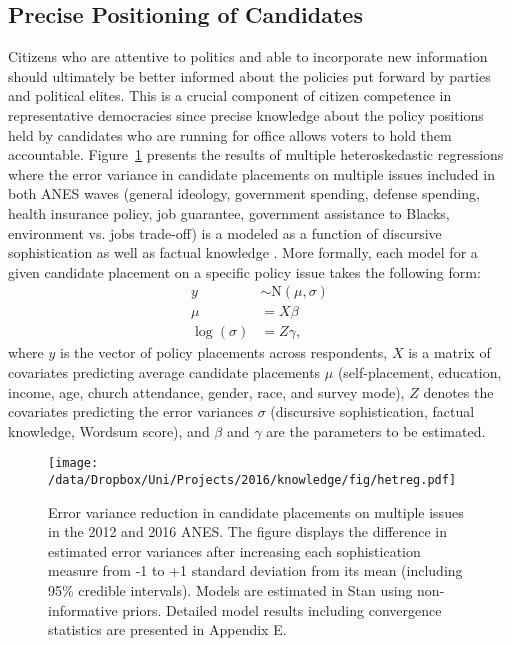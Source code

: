 \subsection{Precise Positioning of Candidates}
Citizens who are attentive to politics and able to incorporate new information should ultimately be better informed about the policies put forward by parties and political elites. This is a crucial component of citizen competence in representative democracies since precise knowledge about the policy positions held by candidates who are running for office allows voters to hold them accountable. Figure~\ref{fig:hetreg} presents the results of multiple heteroskedastic regressions where the error variance in candidate placements on multiple issues included in both ANES waves (general ideology, government spending, defense spending, health insurance policy, job guarantee, government assistance to Blacks, environment vs. jobs trade-off) is a modeled as a function of discursive sophistication as well as factual knowledge \citep[see][for a similar procedure]{jacoby2006value}. More formally, each model for a given candidate placement on a specific policy issue takes the following form:
\begin{align}
y &\sim \text{N}(\mu, \sigma) \\
\mu &= X\beta \\
\log(\sigma) &= Z\gamma,
\end{align}
where $y$ is the vector of policy placements across respondents, $X$ is a matrix of covariates predicting average candidate placements $\mu$ (self-placement, education, income, age, church attendance, gender, race, and survey mode), $Z$ denotes the covariates predicting the error variances $\sigma$ (discursive sophistication, factual knowledge, Wordsum score), and $\beta$ and $\gamma$ are the parameters to be estimated.

\begin{figure}[h]\centering
\texttt{[image: /data/Dropbox/Uni/Projects/2016/knowledge/fig/hetreg.pdf]}
\caption{Error variance reduction in candidate placements on multiple issues in the 2012 and 2016 ANES. The figure displays the difference in estimated error variances after increasing each sophistication measure from -1 to +1 standard deviation from its mean (including 95\% credible intervals). Models are estimated in Stan using non-informative priors. Detailed model results including convergence statistics are presented in Appendix E.}\label{fig:hetreg}
\end{figure}

